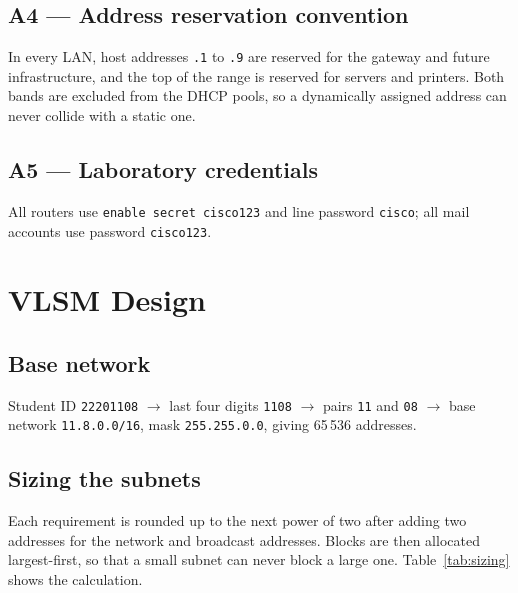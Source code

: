 \documentclass[11pt,a4paper]{article}
\newcommand{\netc}[1]{\texttt{\small #1}}
\begin{document}
\subsection{A4 --- Address reservation convention}
In every LAN, host addresses \netc{.1} to \netc{.9} are reserved for the
gateway and future infrastructure, and the top of the range is reserved for
servers and printers. Both bands are excluded from the DHCP pools, so a
dynamically assigned address can never collide with a static one.

\subsection{A5 --- Laboratory credentials}
All routers use \netc{enable secret cisco123} and line password \netc{cisco};
all mail accounts use password \netc{cisco123}.

\clearpage
\section{VLSM Design}

\subsection{Base network}
Student ID \netc{22201108} $\rightarrow$ last four digits \netc{1108}
$\rightarrow$ pairs \netc{11} and \netc{08} $\rightarrow$ base network
\netc{11.8.0.0/16}, mask \netc{255.255.0.0}, giving 65\,536 addresses.

\subsection{Sizing the subnets}
Each requirement is rounded up to the next power of two after adding two
addresses for the network and broadcast addresses. Blocks are then allocated
largest-first, so that a small subnet can never block a large one.
Table~\ref{tab:sizing} shows the calculation.
\end{document}
